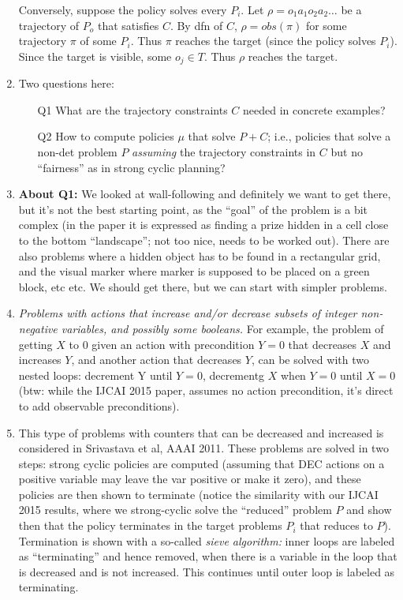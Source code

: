 \documentclass{article}
\begin{document}
\begin{enumerate}
{  Conversely, suppose the policy solves every $P_i$. Let $\rho = o_1 a_1 o_2 a_2 \dots$ be a trajectory of $P_o$ that satisfies $C$. By dfn of $C$, $\rho = obs(\pi)$ for some trajectory $\pi$ of some $P_i$. Thus $\pi$ reaches the target (since the policy solves $P_i$). Since the target is visible, some $o_j \in T$. Thus $\rho$ reaches the target.
  }
  
\item Two questions here:
  \begin{itemize}
  \item[Q1] What are the trajectory constraints $C$ needed in concrete examples?
  \item[Q2] How to compute policies $\mu$ that solve $P+C$; i.e., policies that solve a non-det problem $P$ \emph{assuming} the trajectory constraints
    in $C$ but no  ``fairness'' as in strong cyclic planning?
  \end{itemize}


\item \textbf{About Q1:} We looked at wall-following and definitely we want to get there, but it's not the best starting point, as the ``goal''
  of the problem   is a bit complex (in the paper it  is expressed as finding a prize hidden in a cell close to the bottom ``landscape'';
  not too nice, needs to be   worked out). There are also problems where a hidden object has to be found in a rectangular grid, and the visual marker where marker
  is supposed to be placed on a green block, etc etc. We should get there, but we can start with simpler problems.

  \item \textsl{Problems with   actions that increase and/or decrease subsets of integer non-negative variables, and possibly some booleans.} For example,
  the problem of getting $X$ to $0$ given an  action with precondition $Y=0$ that decreases $X$ and increases $Y$, and another
  action that decreases $Y$, can be solved with  two nested loops: decrement  Y until $Y=0$, decrementg $X$ when $Y=0$ until $X=0$
  (btw: while the IJCAI 2015 paper, assumes no action precondition, it's direct to add observable preconditions).
  

  
\item This type of problems with counters that can be decreased and increased is considered in Srivastava et al, AAAI 2011.
  These problems are solved in two steps: strong cyclic policies are computed (assuming that DEC actions on a positive variable
  may leave the var positive or make it zero),  and these policies are then shown to terminate  (notice the similarity with our IJCAI 2015 results,
  where we strong-cyclic solve the ``reduced'' problem $P$ and    show then that  the policy terminates in the target problems $P_i$ that reduces to $P$).
  Termination is shown with a so-called \emph{sieve algorithm:}   inner loops are labeled as ``terminating'' and hence removed,  when there is a variable
  in the loop that is decreased and  is not increased. This continues until outer loop is labeled as terminating.


\end{enumerate}
\end{document}
